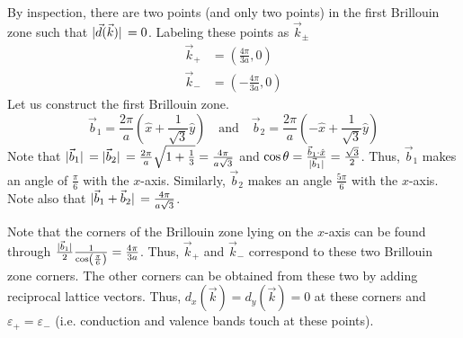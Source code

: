 \documentclass[12pt,a4paper,titlepage]{article}
\newcommand{\trm}[1]{\textrm{#1}} %
\begin{document}
By inspection, there are two points (and only two points) in the first Brillouin zone such that $\abs*{\vec{d}(\vec{k})}=0$. Labeling these points as $\vec{k}_{\pm}$
\begin{equation}
\begin{aligned}
\vec{k}_{+}&=\left(\frac{4\pi}{3a},0\right)\\
\vec{k}_{-}&=\left(-\frac{4\pi}{3a},0\right)
\end{aligned}
\end{equation}
Let us construct the first Brillouin zone.
\begin{equation}
\vec{b}_{1}=\frac{2\pi}{a}\left(\hat{x}+\frac{1}{\sqrt{3}}\hat{y}\right)\quad\trm{and}\quad\vec{b}_{2}=\frac{2\pi}{a}\left(-\hat{x}+\frac{1}{\sqrt{3}}\hat{y}\right)
\end{equation}
Note that $\abs*{\vec{b}_{1}}=\abs*{\vec{b}_{2}}=\frac{2\pi}{a}\sqrt{1+\frac{1}{3}}=\frac{4\pi}{a\sqrt{3}}$ and $\cos\theta=\frac{\vec{b}_{1}\cdot\hat{x}}{\abs*{\vec{b}_{1}}}=\frac{\sqrt{3}}{2}$. Thus, $\vec{b}_{1}$ makes an angle of $\frac{\pi}{6}$ with the $x$-axis. Similarly, $\vec{b}_{2}$ makes an angle $\frac{5\pi}{6}$ with the $x$-axis. Note also that $\abs*{\vec{b}_{1}+\vec{b}_{2}}=\frac{4\pi}{a\sqrt{3}}$.
\begin{center}
\end{center}
Note that the corners of the Brillouin zone lying on the $x$-axis can be found through $\frac{\abs*{\vec{b}_{1}}}{2}\frac{1}{\cos\left(\frac{\pi}{6}\right)}=\frac{4\pi}{3a}$. Thus, $\vec{k}_{+}$ and $\vec{k}_{-}$ correspond to these two Brillouin zone corners. The other corners can be obtained from these two by adding reciprocal lattice vectors. Thus, $d_{x}(\vec{k})=d_{y}(\vec{k})=0$ at these corners and $\varepsilon_{+}=\varepsilon_{-}$ (i.e. conduction and valence bands touch at these points).
\end{document}

